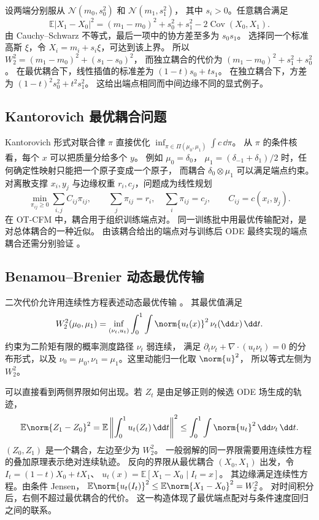 \begin{example}[一维高斯的最优耦合]
设两端分别服从 \(\mathcal N(m_0,s_0^2)\) 和 \(\mathcal N(m_1,s_1^2)\)，
其中 \(s_i>0\)。任意耦合满足
\[
  \mathbb E|X_1-X_0|^2
    =(m_1-m_0)^2+s_0^2+s_1^2-2\operatorname{Cov}(X_0,X_1).
\]
由 Cauchy--Schwarz 不等式，最后一项中的协方差至多为 \(s_0s_1\)。
选择同一个标准高斯 \(\xi\)，令 \(X_i=m_i+s_i\xi\)，可达到该上界。
所以 \(W_2^2=(m_1-m_0)^2+(s_1-s_0)^2\)，
而独立耦合的代价为 \((m_1-m_0)^2+s_1^2+s_0^2\)。
在最优耦合下，线性插值的标准差为 \((1-t)s_0+ts_1\)。
在独立耦合下，方差为 \((1-t)^2s_0^2+t^2s_1^2\)。
这给出端点相同而中间边缘不同的显式例子。
\end{example}

\subsection{Kantorovich 最优耦合问题}

Kantorovich 形式对联合律 \(\pi\) 直接优化
\(\inf_{\pi\in\Pi(\mu_0,\mu_1)}\int c\,\dd\pi\)。
从 \(\pi\) 的条件核看，每个 \(x\) 可以把质量分给多个 \(y\)。
例如 \(\mu_0=\delta_0\)，
\(\mu_1=(\delta_{-1}+\delta_1)/2\) 时，任何确定性映射只能把一个原子变成一个原子，
而耦合 \(\delta_0\otimes\mu_1\) 可以满足端点约束。
对离散支撑 \(x_i,y_j\) 与边缘权重 \(r_i,c_j\)，问题成为线性规划
\[
  \min_{\pi_{ij}\ge0}\sum_{i,j} C_{ij}\pi_{ij},
  \qquad \sum_j\pi_{ij}=r_i,\quad \sum_i\pi_{ij}=c_j,
  \qquad C_{ij}=c(x_i,y_j).
\]
在 OT-CFM 中，耦合用于组织训练端点对。
同一训练批中用最优传输配对，是对总体耦合的一种近似。
由该耦合给出的端点对与训练后 ODE 最终实现的端点耦合还需分别验证
\cite{tong2024otcfm}。

\subsection{Benamou--Brenier 动态最优传输}

二次代价允许用连续性方程表述动态最优传输 \cite{benamou2000ot}。
其最优值满足
\begin{equation}
  W_2^2(\mu_0,\mu_1)=
    \inf_{(\nu_t,u_t)}
    \int_0^1\int \norm{u_t(x)}^2\,\nu_t(\dd x)\,\dd t .
  \label{eq:foundations-bb}
\end{equation}
约束为二阶矩有限的概率测度路径 \(\nu_t\) 弱连续，
满足 \(\partial_t\nu_t+\nabla\cdot(u_t\nu_t)=0\) 的分布形式，以及
\(\nu_0=\mu_0,\nu_1=\mu_1\)。这里动能归一化取 \(\norm{u}^2\)，
所以等式左侧为 \(W_2^2\)。

可以直接看到两侧界限如何出现。若 \(Z_t\) 是由足够正则的候选 ODE 场生成的轨迹，
\[
  \mathbb E\norm{Z_1-Z_0}^2
    =\mathbb E\left\lVert\int_0^1u_t(Z_t)\,\dd t\right\rVert^2
    \le\int_0^1\int\norm{u_t}^2\,\dd\nu_t\,\dd t .
\]
\((Z_0,Z_1)\) 是一个耦合，左边至少为 \(W_2^2\)。
一般弱解的同一界限需要用连续性方程的叠加原理表示绝对连续轨迹。
反向的界限从最优耦合 \((X_0,X_1)\) 出发，令
\(I_t=(1-t)X_0+tX_1\)、
\(u_t(x)=\mathbb E[X_1-X_0\mid I_t=x]\)。
其边缘满足连续性方程。由条件 Jensen，
\(\mathbb E\norm{u_t(I_t)}^2\le\mathbb E\norm{X_1-X_0}^2=W_2^2\)。
对时间积分后，右侧不超过最优耦合的代价。
这一构造体现了最优端点配对与条件速度回归之间的联系。

